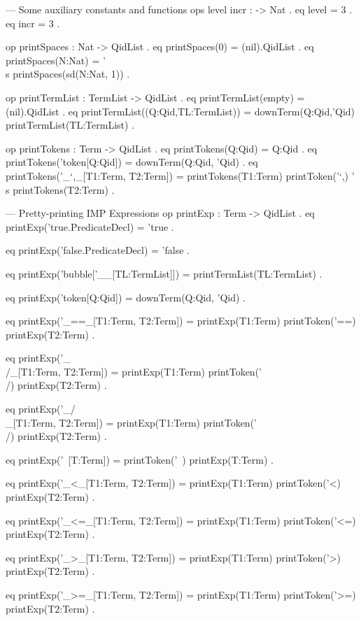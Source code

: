 \documentclass{llncs}%
\begin{document}
    --- Some auxiliary constants and functions
    ops level incr : -> Nat .
    eq level = 3 .
    eq incr = 3 .

    op printSpaces : Nat -> QidList .
    eq printSpaces(0) = (nil).QidList .
    eq printSpaces(N:Nat) = '\\s printSpaces(sd(N:Nat, 1)) .

    op printTermList : TermList -> QidList .
    eq printTermList(empty) = (nil).QidList .
    eq printTermList((Q:Qid,TL:TermList)) =
       downTerm(Q:Qid,'Qid) printTermList(TL:TermList) .

    op printTokens : Term -> QidList .
        eq printTokens(Q:Qid) = Q:Qid .
        eq printTokens('token[Q:Qid]) = downTerm(Q:Qid, 'Qid) .
        eq printTokens('_`,_[T1:Term, T2:Term]) =
           printTokens(T1:Term) printToken('`,) '\\s printTokens(T2:Term) .

    --- Pretty-printing IMP Expressions
    op printExp : Term -> QidList .
    eq printExp('true.PredicateDecl) = 'true .

    eq printExp('false.PredicateDecl) = 'false .

    eq printExp('bubble['__[TL:TermList]]) = printTermList(TL:TermList) .

    eq printExp('token[Q:Qid]) = downTerm(Q:Qid, 'Qid) .

    eq printExp('_==_[T1:Term, T2:Term]) =
       printExp(T1:Term) printToken('==) printExp(T2:Term) .

    eq printExp('_\\/_[T1:Term, T2:Term]) =
       printExp(T1:Term) printToken('\\/) printExp(T2:Term) .

    eq printExp('_/\\_[T1:Term, T2:Term]) =
       printExp(T1:Term) printToken('\\/) printExp(T2:Term) .

    eq printExp('~[T:Term]) =
       printToken('~) printExp(T:Term) .

    eq printExp('_<_[T1:Term, T2:Term]) =
       printExp(T1:Term) printToken('<) printExp(T2:Term) .

    eq printExp('_<=_[T1:Term, T2:Term]) =
       printExp(T1:Term) printToken('<=) printExp(T2:Term) .

    eq printExp('_>_[T1:Term, T2:Term]) =
       printExp(T1:Term) printToken('>) printExp(T2:Term) .

    eq printExp('_>=_[T1:Term, T2:Term]) =
       printExp(T1:Term) printToken('>=) printExp(T2:Term) .
\end{document}
